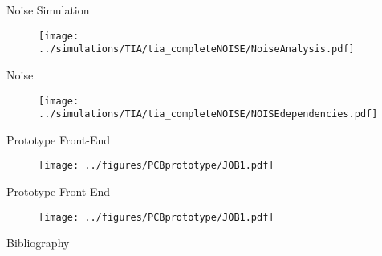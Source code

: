 \documentclass[t]{beamer}
\begin{document}
\begin{frame}[c,noframenumbering]{Noise Simulation}
	\begin{figure}
		\centering
		\texttt{[image: ../simulations/TIA/tia\_completeNOISE/NoiseAnalysis.pdf]}
		\label{fig:tia:noise:CF}	
	\end{figure}
\end{frame}

\begin{frame}[c]{Noise}
\begin{figure}
	\centering
	\texttt{[image: ../simulations/TIA/tia\_completeNOISE/NOISEdependencies.pdf]}
	\label{fig:tia:noise:dep}
\end{figure}
\end{frame}

\begin{frame}[c,noframenumbering]{Prototype Front-End}
\begin{figure}
	\texttt{[image: ../figures/PCBprototype/JOB1.pdf]}
\end{figure}
\end{frame}

\begin{frame}[c,noframenumbering]{Prototype Front-End}
\begin{figure}
	\texttt{[image: ../figures/PCBprototype/JOB1.pdf]}
\end{figure}
\end{frame}

\begin{frame}[c,noframenumbering]{Bibliography}
		
\end{frame}
\end{document}
